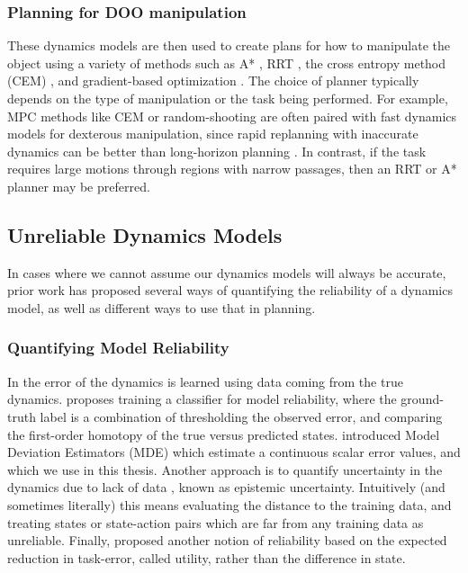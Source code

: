 \subsubsection{Planning for DOO manipulation}

These dynamics models are then used to create plans for how to manipulate the object using a variety of methods such as A* \cite{Wang2019}, RRT \cite{Ichter2019}, the cross entropy method (CEM) \cite{Hafner2019}, and gradient-based optimization \cite{Srinivas2018}. The choice of planner typically depends on the type of manipulation or the task being performed. For example, MPC methods like CEM or random-shooting are often paired with fast dynamics models for dexterous manipulation, since rapid replanning with inaccurate dynamics can be better than long-horizon planning \cite{Finn2017,NagabandiImageConditiondDynamics2018,Nagabandi2018}. In contrast, if the task requires large motions through regions with narrow passages, then an RRT or A* planner may be preferred.

\subsection{Unreliable Dynamics Models}

In cases where we cannot assume our dynamics models will always be accurate, prior work has proposed several ways of quantifying the reliability of a dynamics model, as well as different ways to use that in planning.

\subsubsection{Quantifying Model Reliability}

In \cite{MDEs22,PatchPlans2020} the error of the dynamics is learned using data coming from the true dynamics. \cite{UnreliableDale2019} proposes training a classifier for model reliability, where the ground-truth label is a combination of thresholding the observed error, and comparing the first-order homotopy of the true versus predicted states. \cite{MDEs22} introduced Model Deviation Estimators (MDE) which estimate a continuous scalar error values, and which we use in this thesis. Another approach is to quantify uncertainty in the dynamics due to lack of data \cite{Lakshminarayanan2017,Chua2018,CraigLipshitz2021}, known as epistemic uncertainty. Intuitively (and sometimes literally) this means evaluating the distance to the training data, and treating states or state-action pairs which are far from any training data as unreliable. Finally, \cite{DaleBandit} proposed another notion of reliability based on the expected reduction in task-error, called utility, rather than the difference in state.

